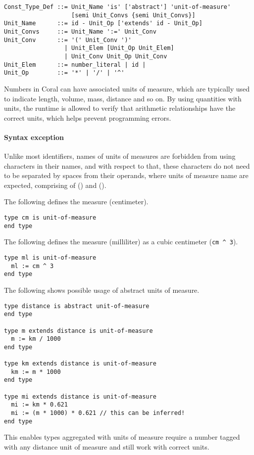 \syntax\begin{lstlisting}
Const_Type_Def ::= Unit_Name 'is' ['abstract'] 'unit-of-measure' 
                   [semi Unit_Convs {semi Unit_Convs}]
Unit_Name      ::= id - Unit_Op ['extends' id - Unit_Op]
Unit_Convs     ::= Unit_Name ':=' Unit_Conv
Unit_Conv      ::= '(' Unit_Conv ')'
                 | Unit_Elem [Unit_Op Unit_Elem]
                 | Unit_Conv Unit_Op Unit_Conv
Unit_Elem      ::= number_literal | id |
Unit_Op        ::= '*' | '/' | '^'
\end{lstlisting}

Numbers in Coral can have associated units of measure, which are typically used to indicate length, volume, mass, distance and so on. By using quantities with units, the runtime is allowed to verify that arithmetic relationships have the correct units, which helps prevent programming errors. 

\paragraph{Syntax exception}
Unlike most identifiers, names of units of measures are forbidden from using  characters in their names, and with respect to that, these characters do not need to be separated by spaces from their operands, where units of measure name are expected, comprising of () and ().

\example The following defines the measure  (centimeter).
\begin{lstlisting}
type cm is unit-of-measure
end type
\end{lstlisting}

\example The following defines the measure  (milliliter) as a cubic centimeter (\lstinline!cm ^ 3!).
\begin{lstlisting}
type ml is unit-of-measure
  ml := cm ^ 3
end type
\end{lstlisting}

\example The following shows possible usage of abstract units of measure. 
\begin{lstlisting}
type distance is abstract unit-of-measure
end type

type m extends distance is unit-of-measure
  m := km / 1000
end type

type km extends distance is unit-of-measure
  km := m * 1000
end type

type mi extends distance is unit-of-measure
  mi := km * 0.621
  mi := (m * 1000) * 0.621 // this can be inferred!
end type
\end{lstlisting}
This enables types aggregated with units of measure require a number tagged with any distance unit of measure and still work with correct units. 

